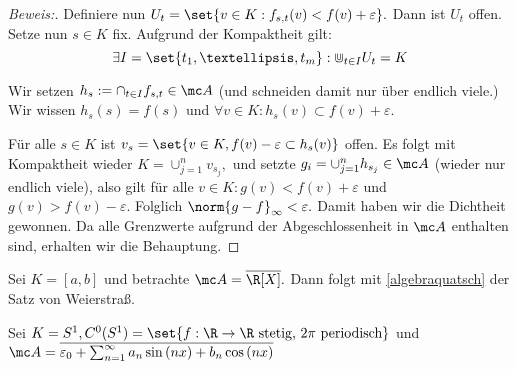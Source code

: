 \begin{theorem}
\begin{proof}[Beweis:]
		Definiere nun $U_t = \set{v \in K: f_{s, t}(v) < f(v)+\varepsilon}.$ Dann ist $U_t$ offen. Setze nun $s \in K$ fix. Aufgrund der Kompaktheit gilt: \[\exists I = \set{t_1, …, t_m}: \Cup_{t \in I}U_t = K\] 
		
		Wir setzen $h_s := \cap_{t \in I}f_{s, t} \in \mc A$ (und schneiden damit nur über endlich viele.) Wir wissen $h_s(s)=f(s)$ und $\forall v \in K: h_s(v) \subset f(v)+\varepsilon.$
		
		Für alle $s \in K$ ist $v_s = \set{v \in K, f(v)- \varepsilon \subset h_s(v)}$ offen. Es folgt mit Kompaktheit wieder $K = \cup_{j=1}^n v_{s_j},$ und setzte $g_i = \cup_{j=1}^n h_{s_j} \in \mc A$ (wieder nur endlich viele), also gilt für alle $v \in K: g(v) < f(v)+\varepsilon$ und $g(v) > f(v) -\varepsilon.$ Folglich $\norm{g-f}_{\infty} < \varepsilon.$ Damit haben wir die Dichtheit gewonnen. Da alle Grenzwerte aufgrund der Abgeschlossenheit in $\mc A$ enthalten sind, erhalten wir die Behauptung.
		
	\end{proof}
	
\end{theorem}


\begin{ex} Sei $K = [a, b]$ und betrachte $\mc A = \overline{\R[X]}.$ Dann folgt mit \ref{algebraquatsch} der Satz von Weierstraß. 
	
\end{ex}


\begin{ex} Sei $K = S^1, C^0(S^1) = \set{f: \R \to \R \text{ stetig, }2\pi \text{ periodisch}}$ und \\\(\mc A = \overline{\varepsilon_0 + \sum_{n = 1}^{\infty}a_n \sin{(nx)} + b_n \cos{(nx)}}\)
	
\end{ex}

